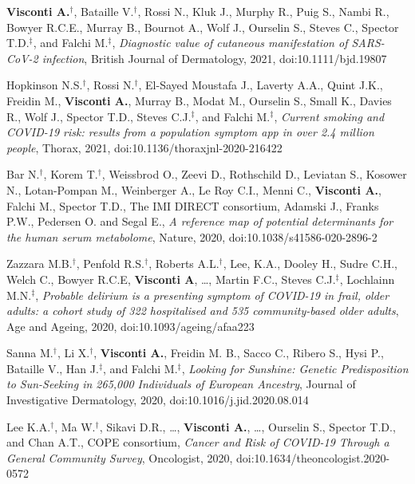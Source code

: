 {\begin{itemize}
	     \textbf{Visconti A.}$^{\textbf{$\dag $}}$, Bataille V.$^{\textbf{$\dag $}}$, Rossi N., Kluk J., Murphy R., Puig S., Nambi R., Bowyer R.C.E., Murray B., Bournot A., Wolf J., Ourselin S., Steves C., Spector T.D.$^{\textbf{$\ddag $}}$, and Falchi M.$^{\textbf{$\ddag $}}$, \emph{Diagnostic value of cutaneous manifestation of SARS-CoV-2 infection}, British Journal of Dermatology, 2021, doi:10.1111/bjd.19807
		
		 Hopkinson N.S.$^{\textbf{$\dag $}}$, Rossi N.$^{\textbf{$\dag $}}$, El-Sayed Moustafa J., Laverty A.A., Quint J.K., Freidin M., \textbf{Visconti A.}, Murray B., Modat M., Ourselin S., Small K., Davies R., Wolf J., Spector T.D., Steves C.J.$^{\textbf{$\ddag $}}$, and Falchi M.$^{\textbf{$\ddag $}}$, \emph{Current smoking and COVID-19 risk: results from a population symptom app in over 2.4 million people}, Thorax, 2021, doi:10.1136/thoraxjnl-2020-216422		
			
		 Bar N.$^{\textbf{$\dag $}}$, Korem T.$^{\textbf{$\dag $}}$, Weissbrod O., Zeevi D., Rothschild D., Leviatan S., Kosower N., Lotan-Pompan M., Weinberger A., Le Roy C.I., Menni C., \textbf{Visconti A.}, Falchi M., Spector T.D., The IMI DIRECT consortium, Adamski J., Franks P.W., Pedersen O. and Segal E., \emph{A reference map of potential determinants for the human serum metabolome}, Nature, 2020, doi:10.1038/s41586-020-2896-2

		 Zazzara M.B.$^{\textbf{$\dag $}}$, Penfold R.S.$^{\textbf{$\dag $}}$, Roberts A.L.$^{\textbf{$\dag $}}$, Lee, K.A., Dooley H., Sudre C.H., Welch C., Bowyer R.C.E, \textbf{Visconti A}, \dots, Martin F.C., Steves C.J.$^{\textbf{$\ddag $}}$, Lochlainn M.N.$^{\textbf{$\ddag $}}$, \emph{Probable delirium is a presenting symptom of COVID-19 in frail, older adults: a cohort study of 322 hospitalised and 535 community-based older adults}, Age and Ageing, 2020, doi:10.1093/ageing/afaa223

		 Sanna M.$^{\textbf{$\dag $}}$, Li X.$^{\textbf{$\dag $}}$, \textbf{Visconti A.}, Freidin M. B., Sacco C., Ribero S., Hysi P., Bataille V., Han J.$^{\textbf{$\ddag $}}$, and Falchi M.$^{\textbf{$\ddag $}}$, \emph{Looking for Sunshine: Genetic Predisposition to Sun-Seeking in 265,000 Individuals of European Ancestry}, Journal of Investigative Dermatology, 2020, doi:10.1016/j.jid.2020.08.014	
		
		 Lee K.A.$^{\textbf{$\dag $}}$, Ma W.$^{\textbf{$\dag $}}$, Sikavi D.R., \dots, \textbf{Visconti A.}, \dots, Ourselin S., Spector T.D., and Chan A.T., COPE consortium, \emph{Cancer and Risk of COVID-19 Through a General Community Survey}, Oncologist, 2020, doi:10.1634/theoncologist.2020-0572	
		

\end{itemize}}
